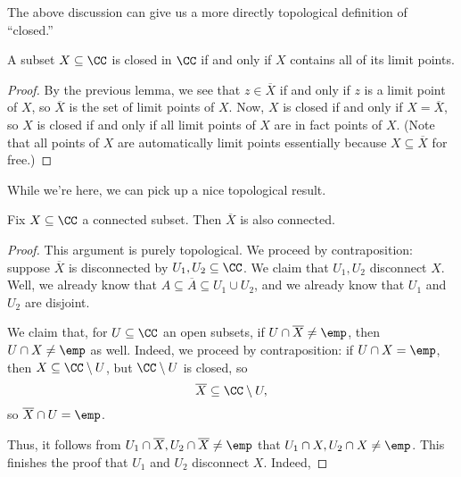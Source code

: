 The above discussion can give us a more directly topological definition of ``closed.''
\begin{lemma}
	A subset $X\subseteq\CC$ is closed in $\CC$ if and only if $X$ contains all of its limit points.
\end{lemma}
\begin{proof}
	By the previous lemma, we see that $z\in\overline X$ if and only if $z$ is a limit point of $X$, so $\overline X$ is the set of limit points of $X$. Now, $X$ is closed if and only if $X=\overline X$, so $X$ is closed if and only if all limit points of $X$ are in fact points of $X$. (Note that all points of $X$ are automatically limit points essentially because $X\subseteq\overline X$ for free.)
\end{proof}

While we're here, we can pick up a nice topological result.
\begin{lemma}
	Fix $X\subseteq\CC$ a connected subset. Then $\overline X$ is also connected.
\end{lemma}
\begin{proof}
	This argument is purely topological. We proceed by contraposition: suppose $\overline X$ is disconnected by $U_1,U_2\subseteq\CC$. We claim that $U_1,U_2$ disconnect $X$. Well, we already know that $A\subseteq\overline A\subseteq U_1\cup U_2$, and we already know that $U_1$ and $U_2$ are disjoint.

	We claim that, for $U\subseteq\CC$ an open subsets, if $U\cap\overline X\ne\emp$, then $U\cap X\ne\emp$ as well. Indeed, we proceed by contraposition: if $U\cap X=\emp$, then $X\subseteq\CC\setminus U$, but $\CC\setminus U$ is closed, so
	\[\overline X\subseteq\CC\setminus U,\]
	so $\overline X\cap U=\emp$.

	Thus, it follows from $U_1\cap\overline X,U_2\cap\overline X\ne\emp$ that $U_1\cap X,U_2\cap X\ne\emp$. This finishes the proof that $U_1$ and $U_2$ disconnect $X$. Indeed, 
\end{proof}

